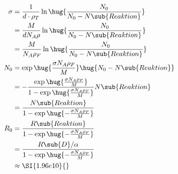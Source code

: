\documentclass[ex]{exercise_4.1}
\begin{document}
\dottedlinete

\begin{align*}
    \sigma 
    &= \frac{1}{d \cdot \rho_T} \ln\hug{\frac{N_0}{N_0 - N\sub{Reaktion}}}\\
    &= \frac{M}{d N_A \rho} \ln\hug{\frac{N_0}{N_0 - N\sub{Reaktion}}}\\
    &= \frac{M}{N_A \rho_F} \ln\hug{\frac{N_0}{N_0 - N\sub{Reaktion}}}\\
    N_0 &= \exp\hug{\frac{\sigma N_A \rho_F}{M}}\hug{{N_0 - N\sub{Reaktion}}}\\
    &= -\frac{\exp\hug{\frac{\sigma N_A \rho_F}{M}}}{1 - \exp\hug{\frac{\sigma N_A \rho_F}{M}}} N\sub{Reaktion}\\
    &= \frac{N\sub{Reaktion}}{1-\exp\hug{-\frac{\sigma N_A \rho_F}{M}}} \\
    R_0 &= \frac{R\sub{Reaktion}}{1-\exp\hug{-\frac{\sigma N_A \rho_F}{M}}} \\
    &= \frac{R\sub{D}/\alpha}{1-\exp\hug{-\frac{\sigma N_A \rho_F}{M}}} \\
    &\approx \SI{1.96e10}{} 
\end{align*}
\end{document}
